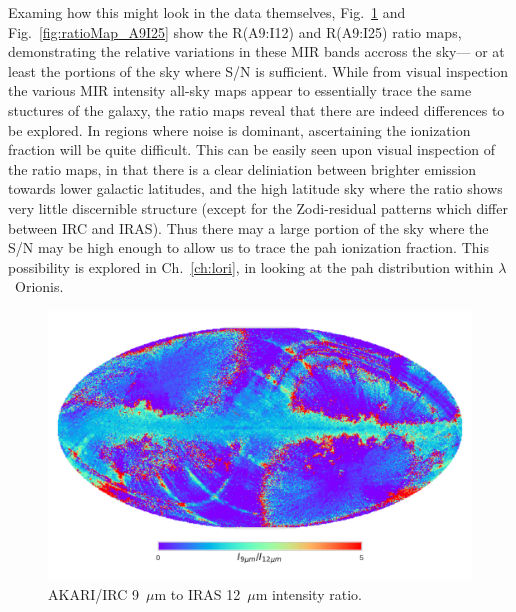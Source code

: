          Examing how this might look in the data themselves, Fig.~\ref{fig:ratioMap_A9I12} and Fig.~\ref{fig:ratioMap_A9I25} show the R(A9:I12) and R(A9:I25) ratio maps, demonstrating the relative variations in these MIR bands accross the sky--- or at least the portions of the sky where S/N is sufficient. While from visual inspection the various MIR intensity all-sky maps appear to essentially trace the same stuctures of the galaxy, the ratio maps reveal that there are indeed differences to be explored.  In regions where noise is dominant, ascertaining the ionization fraction will be quite difficult. This can be easily seen upon visual inspection of the ratio maps, in that there is a clear deliniation between brighter emission towards lower galactic latitudes, and the high latitude sky where the ratio shows very little discernible structure (except for the Zodi-residual patterns which differ between IRC and IRAS). Thus there may a large portion of the sky where the S/N may be high enough to allow us to trace the \acrshort{pah} ionization fraction. This possibility is explored in Ch.~\ref{ch:lori}, in looking at the \acrshort{pah} distribution within $\lambda$~Orionis.
             \begin{figure}
               \centering
               \includegraphics[width=\textwidth]{../Plots/ch_datasources/ratioMap_A9I12.pdf}
               \caption{ AKARI/IRC 9~$\mu$m to IRAS 12~$\mu$m intensity ratio.}
               \label{fig:ratioMap_A9I12}
             \end{figure}

